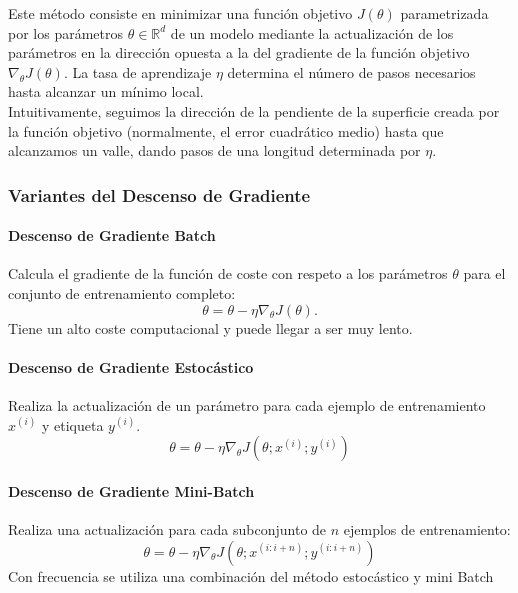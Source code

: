 \documentclass[11pt,twoside,titlepage,a4paper]{article}
\numberwithin{equation}{section} %
\theoremstyle{usual}
\begin{document}
    Este método consiste en minimizar una función objetivo $J(\theta)$ parametrizada por los parámetros $\theta \in \mathbb{R}^d$ de un modelo mediante la actualización de los parámetros en la dirección opuesta a la del gradiente de la función objetivo $\nabla_\theta J(\theta)$. La tasa de aprendizaje $\eta$ determina el número de pasos necesarios hasta alcanzar un mínimo local. \\
    
    Intuitivamente, seguimos la dirección de la pendiente de la superficie creada por la función objetivo (normalmente, el error cuadrático medio) hasta que alcanzamos un valle, dando pasos de una longitud determinada por $\eta$.
    
    \subsubsection{Variantes del Descenso de Gradiente}
    \paragraph{Descenso de Gradiente Batch \\}
    Calcula el gradiente de la función de coste con respeto a los parámetros $\theta$ para el conjunto de entrenamiento completo:
    \begin{equation}
        \theta = \theta - \eta \nabla_\theta J(\theta).
    \end{equation}
    Tiene un alto coste computacional y puede llegar a ser muy lento.
    
    \paragraph{Descenso de Gradiente Estocástico \\}
    Realiza la actualización de un parámetro para cada ejemplo de entrenamiento $x^{(i)}$ y etiqueta $y^{(i)}$.
    \begin{equation}
        \theta = \theta - \eta \nabla_\theta J (\theta; x^{(i)}; y^{(i)})
    \end{equation}
    
    \paragraph{Descenso de Gradiente Mini-Batch \\}
    Realiza una actualización para cada subconjunto de $n$ ejemplos de entrenamiento:
    \begin{equation}
        \theta = \theta - \eta \nabla_\theta J (\theta; x^{(i:i+n)}; y^{(i:i+n)})
    \end{equation}
    Con frecuencia se utiliza una combinación del método estocástico y mini Batch
    
\end{document}
